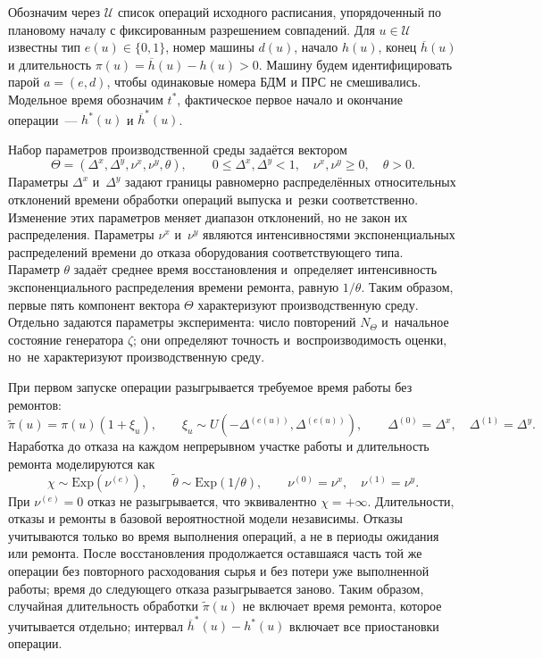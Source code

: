 Обозначим через $\mathcal{U}$ список операций исходного расписания, упорядоченный по плановому началу с фиксированным разрешением совпадений. Для $u\in\mathcal{U}$ известны тип $e(u)\in\{0,1\}$, номер машины $d(u)$, начало $h(u)$, конец $\overline{h}(u)$ и длительность $\pi(u)=\overline{h}(u)-h(u)>0$. Машину будем идентифицировать парой $a=(e,d)$, чтобы одинаковые номера БДМ и ПРС не смешивались. Модельное время обозначим $t^{*}$, фактическое первое начало и окончание операции~--- $h^{*}(u)$ и $\overline{h}^{*}(u)$.

Набор параметров производственной среды задаётся вектором
\[
\Theta=(\Delta^{x},\Delta^{y},\nu^{x},\nu^{y},\theta),
\qquad 0\leq\Delta^{x},\Delta^{y}<1,\quad \nu^{x},\nu^{y}\geq0,\quad\theta>0.
\]
Параметры $\Delta^{x}$ и~$\Delta^{y}$ задают границы равномерно распределённых относительных отклонений времени обработки операций выпуска и~резки соответственно. Изменение этих параметров меняет диапазон отклонений, но не закон их распределения. Параметры $\nu^{x}$ и~$\nu^{y}$ являются интенсивностями экспоненциальных распределений времени до отказа оборудования соответствующего типа. Параметр $\theta$ задаёт среднее время восстановления и~определяет интенсивность экспоненциального распределения времени ремонта, равную $1/\theta$. Таким образом, первые пять компонент вектора $\Theta$ характеризуют производственную среду. Отдельно задаются параметры эксперимента: число повторений $N_{\Theta}$ и~начальное состояние генератора $\zeta$; они определяют точность и~воспроизводимость оценки, но~не характеризуют производственную среду.

При первом запуске операции разыгрывается требуемое время работы без ремонтов:
\[
\widetilde{\pi}(u)=\pi(u)(1+\xi_u),\qquad
\xi_u\sim U(-\Delta^{(e(u))},\Delta^{(e(u))}),
\qquad \Delta^{(0)}=\Delta^x,\quad\Delta^{(1)}=\Delta^y.
\]
Наработка до отказа на каждом непрерывном участке работы и длительность ремонта моделируются как
\[
\chi\sim\mathrm{Exp}(\nu^{(e)}),\qquad
\widetilde{\theta}\sim\mathrm{Exp}(1/\theta),\qquad
\nu^{(0)}=\nu^x,\quad\nu^{(1)}=\nu^y.
\]
При $\nu^{(e)}=0$ отказ не разыгрывается, что эквивалентно $\chi=+\infty$. Длительности, отказы и ремонты в базовой вероятностной модели независимы. Отказы учитываются только во время выполнения операций, а не в периоды ожидания или ремонта. После восстановления продолжается оставшаяся часть той же операции без повторного расходования сырья и без потери уже выполненной работы; время до следующего отказа разыгрывается заново. Таким образом, случайная длительность обработки $\widetilde{\pi}(u)$ не включает время ремонта, которое учитывается отдельно; интервал $\overline{h}^{*}(u)-h^{*}(u)$ включает все приостановки операции.

